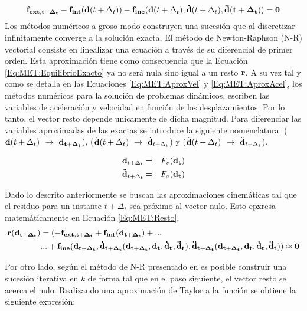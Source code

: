 \begin{equation}\label{Eq:MET:EquilibrioExacto}
	\bf{f}_{ext,t+\Delta_t}-\bf{f}_{int}(\bf{d}\text{$(t+\Delta_t)$})-\bf{f}_{ine}(\bf{d} \text{$(t+\Delta_t)$},\dot{\bf{d}}\text{$(t+\Delta_t)$},\ddot{\bf{d}}(t+\Delta_t))
	=0
\end{equation}
Los métodos numéricos a groso modo construyen una sucesión que al discretizar infinitamente converge a la solución exacta. El método de Newton-Raphson (N-R) vectorial consiste en linealizar una ecuación a través de su diferencial de primer orden. Esta aproximación tiene como consecuencia que la Ecuación \eqref{Eq:MET:EquilibrioExacto} ya no será nula sino igual a un resto $\bf{r}$. A su vez tal y como se detalla en las Ecuaciones \eqref{Eq:MET:AproxVel} y \eqref{Eq:MET:AproxAcel}, los métodos numéricos para la solución de problemas dinámicos, escriben las variables de aceleración y velocidad en función de los desplazamientos. Por lo tanto, el vector resto depende unicamente de dicha magnitud. Para diferenciar las variables aproximadas de las exactas se introduce la siguiente nomenclatura: ($\bf{d}\text{$(t+\Delta_t)$}$ $\rightarrow$ $\bf{d}_{t+\Delta_t}$), ($\dot{\bf{d}}\text{$(t+\Delta_t)$}$ $\rightarrow$ $\dot{\bf{d}}_{t+\Delta_t}$) y ($\ddot{\bf{d}}\text{$(t+\Delta_t)$}$ $\rightarrow$ $\ddot{\bf{d}}_{t+\Delta_t}$). 


\begin{eqnarray}\label{Eq:MET:AproxVel}
\dot{\bf{d}}_{t+\Delta_t}&=&F_v(\bf{d_t})\\
\label{Eq:MET:AproxAcel}
\ddot{\bf{d}}_{t+\Delta_t}&=&F_a(\bf{d_t})
\end{eqnarray}

Dado lo descrito anteriormente se buscan las aproximaciones cinemáticas tal que el residuo para un instante $t +\Delta_t$ sea próximo al vector nulo. Esto epxresa matemáticamente en Ecuación \eqref{Eq:MET:Resto}.
\begin{equation}\label{Eq:MET:Resto}
\begin{split}
	\bf{r}(\bf{d}_{t+\Delta_t})&=(-\bf{f}_{ext,t+\Delta_t}+\bf{f}_{int}(\bf{d}_{t+\Delta_t})+...\\	
	&...+\bf{f}_{ine}(\bf{d_{t+\Delta_t}},\dot{\bf{d}}_{t+\Delta_t}(d_{t+\Delta_t},\bf{d_t},\bf{\dot{d}_t},\bf{\ddot{d}_t}),
	\ddot{\bf{d}}_{t+\Delta_t}(d_{t+\Delta_t},\bf{d_t},\bf{\dot{d}_t},\bf{\ddot{d}_t}))
	\approx 0
\end{split}
\end{equation}

Por otro lado, según el método de N-R presentado en \cite{quarteroni2010numerical} es posible construir una sucesión iterativa en  $k$ de forma tal que en el paso siguiente, el vector resto se acerca el nulo. Realizando una aproximación de Taylor a la función se obtiene la siguiente expresión:

